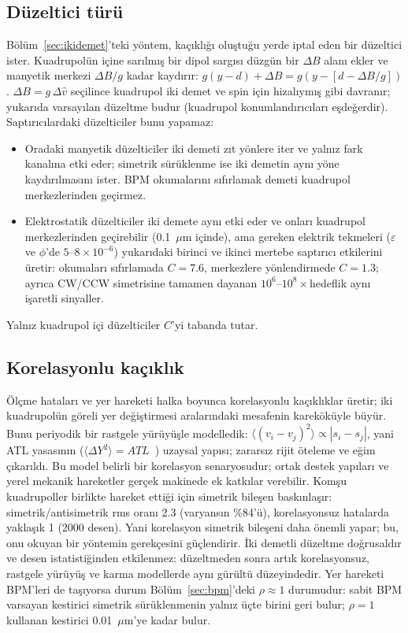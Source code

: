 \documentclass[11pt,a4paper]{article}
\begin{document}
\subsection{Düzeltici türü}\label{sec:duzeltici}
Bölüm~\ref{sec:ikidemet}'teki yöntem, kaçıklığı oluştuğu yerde iptal eden bir düzeltici ister. Kuadrupolün
içine sarılmış bir dipol sargısı düzgün bir $\Delta B$ alanı ekler ve manyetik merkezi $\Delta B/g$ kadar
kaydırır: $g(y-d)+\Delta B=g(y-[d-\Delta B/g])$. $\Delta B=g\,\Delta\hat v$ seçilince kuadrupol iki demet ve spin
için hizalıymış gibi davranır; yukarıda varsayılan düzeltme budur (kuadrupol konumlandırıcıları eşdeğerdir).
Saptırıcılardaki düzelticiler bunu yapamaz:
\begin{itemize}
\item Oradaki manyetik düzelticiler iki demeti zıt yönlere iter ve yalnız fark kanalına etki eder; simetrik
sürüklenme ise iki demetin aynı yöne kaydırılmasını ister. BPM okumalarını sıfırlamak demeti kuadrupol
merkezlerinden geçirmez.
\item Elektrostatik düzelticiler iki demete aynı etki eder ve onları kuadrupol merkezlerinden geçirebilir
(0.1~$\mu$m içinde), ama gereken elektrik tekmeleri ($\varepsilon$ ve $\phi$'de $5$--$8\times10^{-6}$) yukarıdaki
birinci ve ikinci mertebe saptırıcı etkilerini üretir: okumaları sıfırlamada $C=7.6$, merkezlere yönlendirmede
$C=1.3$; ayrıca CW/CCW simetrisine tamamen dayanan $10^6$--$10^8\times$hedeflik aynı işaretli sinyaller.
\end{itemize}
Yalnız kuadrupol içi düzelticiler $C$'yi tabanda tutar.

\subsection{Korelasyonlu kaçıklık}
Ölçme hataları ve yer hareketi halka boyunca korelasyonlu kaçıklıklar üretir; iki kuadrupolün göreli yer
değiştirmesi aralarındaki mesafenin kareköküyle büyür. Bunu periyodik bir rastgele yürüyüşle modelledik:
$\langle(v_i-v_j)^2\rangle\propto|s_i-s_j|$, yani ATL yasasının ($\langle\Delta Y^2\rangle=ATL$~\cite{shiltsev})
uzaysal yapısı; zararsız rijit öteleme ve eğim çıkarıldı. Bu model belirli bir korelasyon senaryosudur; ortak
destek yapıları ve yerel mekanik hareketler gerçek makinede ek katkılar verebilir. Komşu kuadrupoller birlikte
hareket ettiği için simetrik bileşen baskınlaşır: simetrik/antisimetrik rms oranı 2.3 (varyansın \%84'ü),
korelasyonsuz hatalarda yaklaşık 1 (2000 desen). Yani korelasyon simetrik bileşeni daha önemli yapar; bu, onu
okuyan bir yöntemin gerekçesini güçlendirir. İki demetli düzeltme doğrusaldır ve desen istatistiğinden
etkilenmez: düzeltmeden sonra artık korelasyonsuz, rastgele yürüyüş ve karma modellerde aynı gürültü
düzeyindedir. Yer hareketi BPM'leri de taşıyorsa durum Bölüm~\ref{sec:bpm}'deki $\rho\approx1$ durumudur: sabit
BPM varsayan kestirici simetrik sürüklenmenin yalnız üçte birini geri bulur; $\rho=1$ kullanan kestirici
0.01~$\mu$m'ye kadar bulur.
\end{document}
